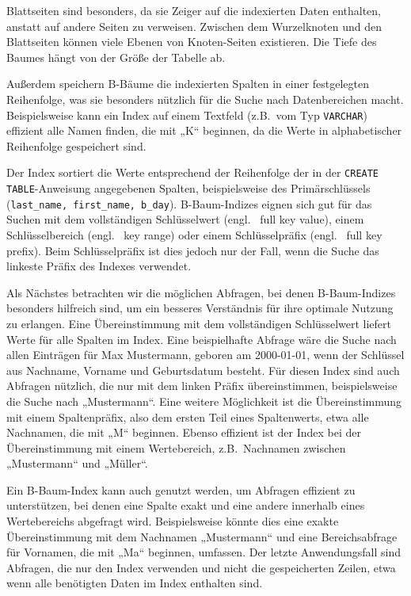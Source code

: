 Blattseiten sind besonders, da sie Zeiger auf die indexierten Daten enthalten, anstatt auf andere Seiten zu verweisen.
Zwischen dem Wurzelknoten und den Blattseiten können viele Ebenen von Knoten-Seiten existieren.
Die Tiefe des Baumes hängt von der Größe der Tabelle ab.

Außerdem speichern B-Bäume die indexierten Spalten in einer festgelegten Reihenfolge, was sie besonders nützlich für die Suche nach Datenbereichen macht.
Beispielsweise kann ein Index auf einem Textfeld (z.B.\ vom Typ \texttt{VARCHAR}) effizient alle Namen finden, die mit „K“ beginnen, da die Werte in alphabetischer Reihenfolge gespeichert sind.

Der Index sortiert die Werte entsprechend der Reihenfolge der in der \texttt{CREATE TABLE}-Anweisung angegebenen Spalten, beispielsweise des Primärschlüssels (\texttt{last\_name, first\_name, b\_day}).
B-Baum-Indizes eignen sich gut für das Suchen mit dem vollständigen Schlüsselwert (engl. \ full key value), einem Schlüsselbereich (engl. \ key range) oder einem Schlüsselpräfix (engl. \ full key prefix).
Beim Schlüsselpräfix ist dies jedoch nur der Fall, wenn die Suche das linkeste Präfix des Indexes verwendet.

Als Nächstes betrachten wir die möglichen Abfragen, bei denen B-Baum-Indizes besonders hilfreich sind, um ein besseres Verständnis für ihre optimale Nutzung zu erlangen.
Eine Übereinstimmung mit dem vollständigen Schlüsselwert liefert Werte für alle Spalten im Index.
Eine beispielhafte Abfrage wäre die Suche nach allen Einträgen für Max Mustermann, geboren am 2000-01-01, wenn der Schlüssel aus Nachname, Vorname und Geburtsdatum besteht.
Für diesen Index sind auch Abfragen nützlich, die nur mit dem linken Präfix übereinstimmen, beispielsweise die Suche nach „Mustermann“.
Eine weitere Möglichkeit ist die Übereinstimmung mit einem Spaltenpräfix, also dem ersten Teil eines Spaltenwerts, etwa alle Nachnamen, die mit „M“ beginnen.
Ebenso effizient ist der Index bei der Übereinstimmung mit einem Wertebereich, z.B.\ Nachnamen zwischen „Mustermann“ und „Müller“.

Ein B-Baum-Index kann auch genutzt werden, um Abfragen effizient zu unterstützen, bei denen eine Spalte exakt und eine andere innerhalb eines Wertebereichs abgefragt wird.
Beispielsweise könnte dies eine exakte Übereinstimmung mit dem Nachnamen „Mustermann“ und eine Bereichsabfrage für Vornamen, die mit „Ma“ beginnen, umfassen.
Der letzte Anwendungsfall sind Abfragen, die nur den Index verwenden und nicht die gespeicherten Zeilen, etwa wenn alle benötigten Daten im Index enthalten sind.

